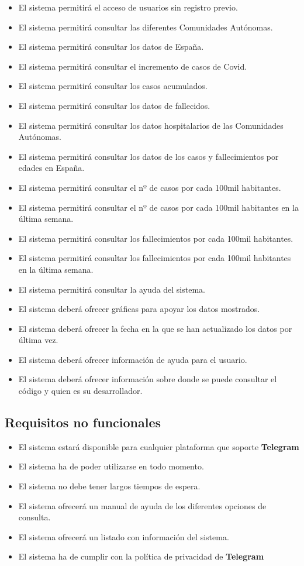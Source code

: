 \begin{itemize}
	\item El sistema permitirá el acceso de usuarios sin registro previo.
	\item El sistema permitirá consultar las diferentes Comunidades Autónomas.
	\item El sistema permitirá consultar los datos de España.
	\item El sistema permitirá consultar el incremento de casos de Covid.
	\item El sistema permitirá consultar los casos acumulados.
	\item El sistema permitirá consultar los datos de fallecidos.
	\item El sistema permitirá consultar los datos hospitalarios de las Comunidades Autónomas.
	\item El sistema permitirá consultar los datos de los casos y fallecimientos por edades en España.
	\item El sistema permitirá consultar el nº de casos por cada 100mil habitantes.
	\item El sistema permitirá consultar el nº de casos por cada 100mil habitantes en la última semana.
	\item El sistema permitirá consultar los fallecimientos por cada 100mil habitantes.
	\item El sistema permitirá consultar los fallecimientos por cada 100mil habitantes en la última semana.
	\item El sistema permitirá consultar la ayuda del sistema.
	\item El sistema deberá ofrecer gráficas para apoyar los datos mostrados.
	\item El sistema deberá ofrecer la fecha en la que se han actualizado los datos por última vez.
	\item El sistema deberá ofrecer información de ayuda para el usuario.
	\item El sistema deberá ofrecer información sobre donde se puede consultar el código y quien es su desarrollador.
\end{itemize}

\subsection{Requisitos no funcionales}

\begin{itemize}
	\item El sistema estará disponible para cualquier plataforma que soporte \textbf{Telegram}
	\item El sistema ha de poder utilizarse en todo momento.
	\item El sistema no debe tener largos tiempos de espera.
	\item El sistema ofrecerá un manual de ayuda de los diferentes opciones de consulta.
	\item El sistema ofrecerá un listado con información del sistema.
	\item El sistema ha de cumplir con la política de privacidad de \textbf{Telegram}
\end{itemize}

